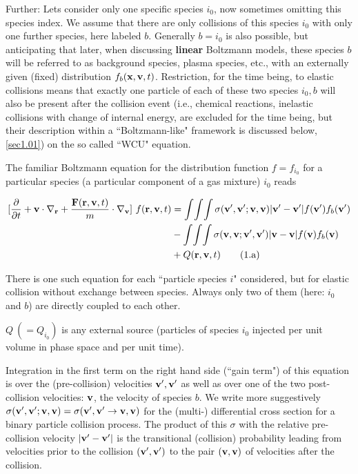 Further: Lets consider only one specific species $i_0$, now sometimes omitting
this species index.
We assume that there are only collisions of this species $i_0$ with only one
further species, here labeled $b$.
Generally $b=i_0$ is also possible, but anticipating that later, when
discussing \textbf{linear} Boltzmann models, these species $b$ will be referred
to as background species, plasma species, etc., with an externally given
(fixed) distribution $f_b(\mathbf{x},\mathbf{v},t)$.
Restriction, for the time being, to elastic collisions means that exactly one
particle of each of these two species $i_0, b$ will also be present after the
collision event (i.e., chemical reactions, inelastic collisions with change of
internal energy, are excluded for the time being, but their description within
a ``Boltzmann-like" framework is discussed below, \cref{sec1.01}) on the so
called ``\ac{WCU}" equation.

The familiar Boltzmann equation for the distribution function $f=f_{i_0}$ for a
particular species (a particular component of a gas mixture) $i_0$ reads

\begin{align}
  \label{eq1a} \lbrack\frac\partial{\partial t} + \mathbf{v} \cdot
  \nabla_{\mathbf{r}} + \frac{\mathbf{F}(\mathbf{r},\mathbf{v},t)}{m} \cdot \nabla_{\mathbf{v}}\rbrack \
  f(\mathbf{r},\mathbf{v},t) & = \int\!\int\!\int \sigma(\mathbf{v}',\mathbf{v}';\mathbf{v},\mathbf{v}) |\mathbf{v}'-\mathbf{v}'| f(\mathbf{v}')
  f_b(\mathbf{v}') \nonumber                                                             \\
               & -
  \int\!\int\!\int
  \sigma(\mathbf{v},\mathbf{v};\mathbf{v}',\mathbf{v}')
  |\mathbf{v}-\mathbf{v}| f(\mathbf{v}) f_b(\mathbf{v})
  \nonumber
  \\
               & + Q(\mathbf{r},\mathbf{v},t)
  \tag{1.a}
\end{align}

There is one such equation for each ``particle species $i$" considered, but for
elastic collision without exchange between species.
Always only two of them (here: $i_0$ and $b$) are directly coupled to each
other.

$Q \ (= Q_{i_0})$ is any external source (particles of species $i_0$ injected
per unit volume  in phase space and per unit time).

Integration in the first term on the right hand side (``gain term") of this
equation is over the (pre-collision) velocities $\mathbf{v}', \mathbf{v}'$  as well as over
one of the two post-collision velocities: $\mathbf{v}$, the velocity of species $b$.
We write more suggestively  $\sigma(\mathbf{v}',\mathbf{v}'; \mathbf{v},\mathbf{v}) = \sigma(\mathbf{v}',\mathbf{v}'
  \rightarrow \mathbf{v},\mathbf{v})$ for the (multi-) differential cross section for a binary
particle collision process.
The product of this $\sigma$ with the relative pre-collision velocity
$|\mathbf{v}'-\mathbf{v}'|$ is the transitional (collision) probability leading from
velocities prior to the collision $(\mathbf{v}',\mathbf{v}')$ to the pair $(\mathbf{v},\mathbf{v})$ of
velocities after the collision.

